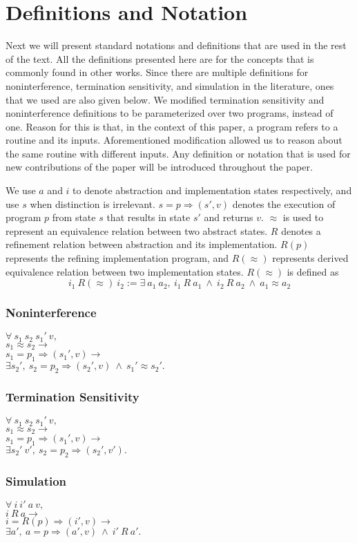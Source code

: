 \section{Definitions and Notation}
Next we will present standard notations and definitions that are used in the rest of the text. All the definitions presented here are for the concepts that is commonly found in other works. Since there are multiple definitions for noninterference, termination sensitivity, and simulation in the literature, ones that we used are also given below. We modified termination sensitivity and noninterference definitions to be parameterized over two programs, instead of one. Reason for this is that, in the context of this paper, a program refers to a routine and its inputs. Aforementioned modification allowed us to reason about the same routine with different inputs. Any definition or notation that is used for new contributions of the paper will be introduced throughout the paper.

We use $a$ and $i$ to denote abstraction and implementation states respectively, and use $s$ when distinction is irrelevant.
$s =p\Rightarrow (s', v)$ denotes the execution of program $p$ from state $s$ that results in state $s'$ and returns $v$. $\approx$ is used to represent an equivalence relation between two abstract states. $R$ denotes a refinement relation between abstraction and its implementation. $R(p)$ represents the refining implementation program, and $R(\approx)$ represents derived equivalence relation between two implementation states. $R(\approx)$ is defined as 
$$
i_1\ R(\approx)\ i_2 := \exists\ a_1\ a_2,\ i_1\ R\ a_1\ \wedge\ i_2\ R\ a_2\ \wedge\ a_1 \approx a_2
$$


\subsubsection*{Noninterference}

$\forall\ s_1\ s_2\ s_1'\ v,$\\
$s_1\approx s_2 \rightarrow$\\
$s_1 =p_1\Rightarrow (s_1', v) \rightarrow$\\
$\exists s_2',\ s_2 =p_2\Rightarrow (s_2', v)\ \wedge\ s_1'\approx s_2'.$

\subsubsection*{Termination Sensitivity}

$\forall\ s_1\ s_2\ s_1'\ v,$\\
$s_1\approx s_2 \rightarrow$\\
$s_1 =p_1\Rightarrow (s_1', v) \rightarrow$\\
$\exists s_2'\ v',\ s_2 =p_2\Rightarrow (s_2', v').$

\subsubsection*{Simulation}

$\forall\ i\ i'\ a\ v,$\\
$i\ R\ a \rightarrow$\\
$i =R(p)\Rightarrow (i', v) \rightarrow$\\
$\exists a',\ a =p\Rightarrow (a', v)\ \wedge\ i'\ R\ a'.$

